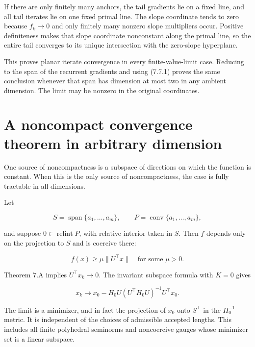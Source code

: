 If there are only finitely many anchors, the tail gradients lie on a
fixed line, and all tail iterates lie on one fixed primal line. The
slope coordinate tends to zero because \(f_k\to0\) and only finitely
many nonzero slope multipliers occur. Positive definiteness makes that
slope coordinate nonconstant along the primal line, so the entire tail
converges to its unique intersection with the zero-slope hyperplane.

This proves planar iterate convergence in every finite-value-limit case.
Reducing to the span of the recurrent gradients and using (7.7.1) proves
the same conclusion whenever that span has dimension at most two in any
ambient dimension. The limit may be nonzero in the original coordinates.


\setcounter{section}{7}
\setcounter{theorem}{0}
\setcounter{lemma}{0}
\setcounter{corollary}{0}
\setcounter{proposition}{0}
\setcounter{remark}{0}
\setcounter{equation}{0}


\section{A noncompact convergence theorem in arbitrary
dimension}\label{H:a-noncompact-convergence-theorem-in-arbitrary-dimension}


One source of noncompactness is a subspace of directions on which the
function is constant. When this is the only source of noncompactness,
the case is fully tractable in all dimensions.

Let

\[
S=\operatorname{span}\{a_1,\ldots,a_m\},\qquad
P=\operatorname{conv}\{a_1,\ldots,a_m\},
\]

and suppose \(0\in\operatorname{relint}P\), with relative interior taken
in \(S\). Then \(f\) depends only on the projection to \(S\) and is
coercive there:

\[
f(x)\ge\mu\|U^\top x\|\quad\text{for some }\mu>0.
\]

Theorem 7.A implies \(U^\top x_k\to0\). The invariant subspace formula
with \(K=0\) gives

\[
\boxed{
x_k\longrightarrow
x_0-H_0U(U^\top H_0U)^{-1}U^\top x_0.
}
\tag{7.8.1}
\]

The limit is a minimizer, and in fact the projection of \(x_0\) onto
\(S^\perp\) in the \(H_0^{-1}\) metric. It is independent of the choices
of admissible accepted lengths. This includes all finite polyhedral
seminorms and noncoercive gauges whose minimizer set is a linear
subspace.


